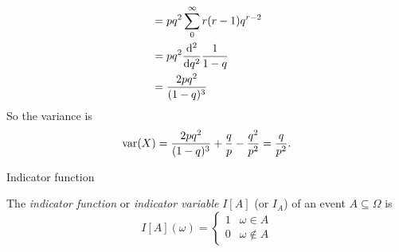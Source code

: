 \begin{note}
\begin{field}
\begin{eg}
\begin{align*}
        &= pq^2 \sum_0^\infty r(r - 1)q^{r - 2}\\
        &= pq^2\frac{\mathrm{d} ^2}{\mathrm{d} q^2}\frac{1}{1 - q}\\
        &= \frac{2pq^2}{(1 - q)^3}
      \end{align*}
      So the variance is
      \[
        \operatorname{var}(X) = \frac{2pq^2}{(1 - q)^3}+ \frac{q}{p} - \frac{q^2}{p^2} = \frac{q}{p^2}.
      \]
    \end{eg}
  \end{field}
  \xplain{}%
\end{note}

%
\begin{note}
  \begin{field}
    Indicator function
  \end{field}
  \begin{field}
    \begin{defi}
      The \emph{indicator function} or \emph{indicator variable} $I[A]$ (or $I_A$) of an event $A\subseteq \Omega$ is
      \[
        I[A](\omega) =
        \begin{cases}
          1 & \omega\in A\\
          0 & \omega\not\in A
        \end{cases}
      \]
    \end{defi}
  \end{field}
  \xplain{}%
\end{note}

